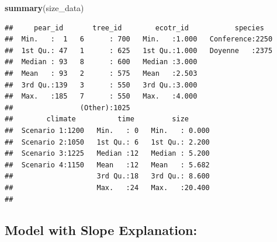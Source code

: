 \documentclass[
]{article}
\newenvironment{Shaded}{\begin{snugshade}}{\end{snugshade}}
\newcommand{\FunctionTok}[1]{\textcolor[rgb]{0.13,0.29,0.53}{\textbf{#1}}}
\newcommand{\NormalTok}[1]{#1}
\newcommand{\OtherTok}[1]{\textcolor[rgb]{0.56,0.35,0.01}{#1}}
\newcommand{\SpecialCharTok}[1]{\textcolor[rgb]{0.81,0.36,0.00}{\textbf{#1}}}
\begin{document}
\begin{Shaded}
\end{Shaded}

\begin{Shaded}
\begin{Highlighting}[]
\FunctionTok{summary}\NormalTok{(size\_data)}
\end{Highlighting}
\end{Shaded}

\begin{verbatim}
##     pear_id       tree_id        ecotr_id           species    
##  Min.   :  1   6      : 700   Min.   :1.000   Conference:2250  
##  1st Qu.: 47   1      : 625   1st Qu.:1.000   Doyenne   :2375  
##  Median : 93   8      : 600   Median :3.000                    
##  Mean   : 93   2      : 575   Mean   :2.503                    
##  3rd Qu.:139   3      : 550   3rd Qu.:3.000                    
##  Max.   :185   7      : 550   Max.   :4.000                    
##                (Other):1025                                    
##        climate          time         size       
##  Scenario 1:1200   Min.   : 0   Min.   : 0.000  
##  Scenario 2:1050   1st Qu.: 6   1st Qu.: 2.200  
##  Scenario 3:1225   Median :12   Median : 5.200  
##  Scenario 4:1150   Mean   :12   Mean   : 5.682  
##                    3rd Qu.:18   3rd Qu.: 8.600  
##                    Max.   :24   Max.   :20.400  
## 
\end{verbatim}

\subsection{Model with Slope
Explanation:}\label{model-with-slope-explanation}
\end{document}
